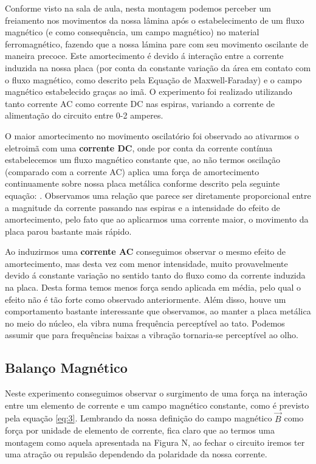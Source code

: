 \documentclass[12pt, a4paper, notitlepage]{article}
\begin{document}
        Conforme visto na sala de aula, nesta montagem podemos perceber um freiamento nos movimentos da nossa lâmina após o estabelecimento de um fluxo magnético (e como consequência, um campo magnético) no material ferromagnético, fazendo que a nossa lámina pare com seu movimento oscilante de maneira precoce. Este amortecimento é devido á interação entre a corrente induzida na nossa placa (por conta da constante variação da área em contato com o fluxo magnético, como descrito pela Equação de Maxwell-Faraday) e o campo magnético estabelecido graças ao imã. O experimento foi realizado utilizando tanto corrente AC como corrente DC nas espiras, variando a corrente de alimentação do circuito entre 0-2 amperes.
        
        O maior amortecimento no movimento oscilatório foi observado ao ativarmos o eletroimã com uma \textbf{corrente DC}, onde por conta da corrente contínua estabelecemos um fluxo magnético constante que, ao não termos oscilação (comparado com a corrente AC) aplica uma força de amortecimento continuamente sobre nossa placa metálica conforme descrito pela seguinte equação: . Observamos uma relação que parece ser diretamente proporcional entre a magnitude da corrente passando nas espiras e a intensidade do efeito de amortecimento, pelo fato que ao aplicarmos uma corrente maior, o movimento da placa parou bastante mais rápido.
        
        Ao induzirmos uma \textbf{corrente AC} conseguimos observar o mesmo efeito de amortecimento, mas desta vez com menor intensidade, muito provavelmente devido á constante variação no sentido tanto do fluxo como da corrente induzida na placa. Desta forma temos menos força sendo aplicada em média, pelo qual o efeito não é tão forte como observado anteriormente. Além disso, houve um comportamento bastante interessante que observamos, ao manter a placa metálica no meio do núcleo, ela vibra numa frequência perceptível ao tato. Podemos assumir que para frequências baixas a vibração tornaria-se perceptível ao olho.
        
        \subsection{Balanço Magnético}
        
        Neste experimento conseguimos observar o surgimento de uma força na interação entre um elemento de corrente e um campo magnético constante, como é previsto pela equação \ref{eq:3}. Lembrando da nossa definição do campo magnético $\vec{B}$ como força por unidade de elemento de corrente, fica claro que ao termos uma montagem como aquela apresentada na Figura N, ao fechar o circuito iremos ter uma atração ou repulsão dependendo da polaridade da nossa corrente.
        
\end{document}
